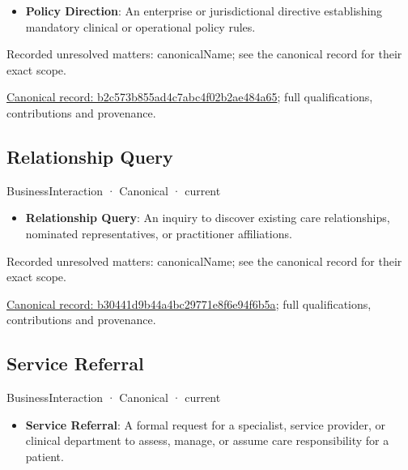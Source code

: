 \begin{itemize}


\item \textbf{Policy Direction}: An enterprise or jurisdictional directive establishing mandatory clinical or operational policy rules.

\end{itemize}

{\small Recorded unresolved matters: canonicalName; see the canonical record for their exact scope.}\par
{\footnotesize \href{../../../../continuum/business/business-interaction/b2c573b855ad4c7abc4f02b2ae484a65.md}{Canonical record: b2c573b855ad4c7abc4f02b2ae484a65}; full qualifications, contributions and provenance.}\par
\subsection{Relationship Query}

\label{element:b30441d9b44a4bc29771e8f6e94f6b5a}
{\small BusinessInteraction · Canonical · current}\par

\begin{itemize}


\item \textbf{Relationship Query}: An inquiry to discover existing care relationships, nominated representatives, or practitioner affiliations.

\end{itemize}

{\small Recorded unresolved matters: canonicalName; see the canonical record for their exact scope.}\par
{\footnotesize \href{../../../../continuum/business/business-interaction/b30441d9b44a4bc29771e8f6e94f6b5a.md}{Canonical record: b30441d9b44a4bc29771e8f6e94f6b5a}; full qualifications, contributions and provenance.}\par
\subsection{Service Referral}

\label{element:b7ea2864b6c044c1a9b7763ee6428d7c}
{\small BusinessInteraction · Canonical · current}\par

\begin{itemize}


\item \textbf{Service Referral}: A formal request for a specialist, service provider, or clinical department to assess, manage, or assume care responsibility for a patient.

\end{itemize}


